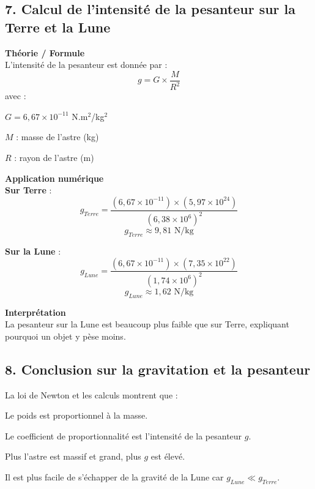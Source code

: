\documentclass[a4paper,12pt]{article}
\begin{document}
\subsection*{7. Calcul de l'intensité de la pesanteur sur la Terre et la Lune}
\begin{compactenum}
    \item \textbf{Théorie / Formule} \\
    L'intensité de la pesanteur est donnée par :
    \begin{equation}
        g = G \times \frac{M}{R^2}
    \end{equation}
    avec :
    \begin{compactenum}
        \item $G = 6,67 \times 10^{-11}$ N.m$^2$/kg$^2$
        \item $M$ : masse de l'astre (kg)
        \item $R$ : rayon de l'astre (m)
    \end{compactenum}
    
    \item \textbf{Application numérique} \\
    \textbf{Sur Terre} :
    \begin{equation}
        g_{Terre} = \frac{(6,67 \times 10^{-11}) \times (5,97 \times 10^{24})}{(6,38 \times 10^6)^2}
    \end{equation}
    \begin{equation}
        g_{Terre} \approx 9,81 \text{ N/kg}
    \end{equation}
    
    \textbf{Sur la Lune} :
    \begin{equation}
        g_{Lune} = \frac{(6,67 \times 10^{-11}) \times (7,35 \times 10^{22})}{(1,74 \times 10^6)^2}
    \end{equation}
    \begin{equation}
        g_{Lune} \approx 1,62 \text{ N/kg}
    \end{equation}
    
    \item \textbf{Interprétation} \\
    La pesanteur sur la Lune est beaucoup plus faible que sur Terre, expliquant pourquoi un objet y pèse moins.
\end{compactenum}

\subsection*{8. Conclusion sur la gravitation et la pesanteur}
La loi de Newton et les calculs montrent que :
\begin{compactenum}
    \item Le poids est proportionnel à la masse.
    \item Le coefficient de proportionnalité est l'intensité de la pesanteur $g$.
    \item Plus l'astre est massif et grand, plus $g$ est élevé.
    \item Il est plus facile de s'échapper de la gravité de la Lune car $g_{Lune} \ll g_{Terre}$.
\end{compactenum}
\end{document}

